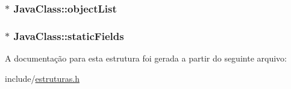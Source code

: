 \subsubsection[{\texorpdfstring{object\+List}{objectList}}]{$\ast$ Java\+Class\+::object\+List}\hypertarget{struct_java_class_af33546b53017ca696367a08e9e30b115}{}\label{struct_java_class_af33546b53017ca696367a08e9e30b115}
\subsubsection[{\texorpdfstring{static\+Fields}{staticFields}}]{$\ast$ Java\+Class\+::static\+Fields}\hypertarget{struct_java_class_a4ce091e3ddb1f607166c6e64c39cf53a}{}\label{struct_java_class_a4ce091e3ddb1f607166c6e64c39cf53a}


A documentação para esta estrutura foi gerada a partir do seguinte arquivo\+:\begin{DoxyCompactItemize}
\item 
include/\hyperlink{estruturas_8h}{estruturas.\+h}\end{DoxyCompactItemize}
